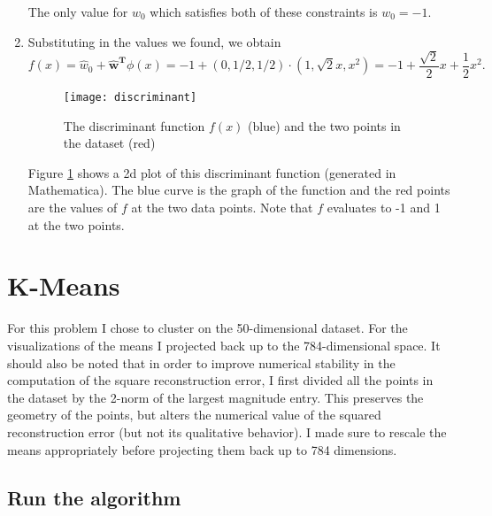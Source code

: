\documentclass{article}
\begin{document}
\begin{enumerate}
	The only value for $w_0$ which satisfies both of these constraints is $w_0=-1$.
	\item Substituting in the values we found, we obtain
	\[
		f(x) = \hat w_0 + \bm{\hat w^T}\phi(x) = -1 + (0,1/2,1/2)\cdot(1,\sqrt{2}x,x^2) = -1 + \frac{\sqrt{2}}{2}x+\frac12x^2.
	\]
	\begin{figure}
        \centering
        \texttt{[image: discriminant]}
        \caption{The discriminant function $f(x)$ (blue) and the two points in the dataset (red)} 
        \label{fig:discr}
    \end{figure}
    Figure \ref{fig:discr} shows a 2d plot of this discriminant function (generated in Mathematica). The blue curve is the graph of the function and the red points are the values of $f$ at the two data points. Note that $f$ evaluates to -1 and 1 at the two points.
\end{enumerate}


\section{K-Means}
For this problem I chose to cluster on the 50-dimensional dataset. For the visualizations of the means I projected back up to the 784-dimensional space. It should also be noted that in order to improve numerical stability in the computation of the square reconstruction error, I first divided all the points in the dataset by the 2-norm of the largest magnitude entry. This preserves the geometry of the points, but alters the numerical value of the squared reconstruction error (but not its qualitative behavior). I made sure to rescale the means appropriately before projecting them back up to 784 dimensions.

\subsection{Run the algorithm}
\end{document}
